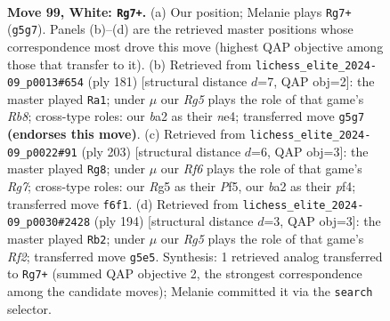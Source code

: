 \documentclass[11pt]{article}
\begin{document}
\clearpage

\begin{figure}[p]\centering
\begin{subfigure}{0.46\textwidth}\centering
\resizebox{\linewidth}{!}{%
\newchessgame
\chessboard[
  setfen={1r6/1k6/5R2/6R1/4K3/8/b7/8 w - - 0 99},
  showmover=false,
  pgfstyle=straightmove, color=movearrow, markmove={g5-g7}
]}
\caption{}
\end{subfigure}\hfill
\begin{subfigure}{0.46\textwidth}\centering
\resizebox{\linewidth}{!}{%
\newchessgame
\chessboard[
  setfen={k7/2RK4/8/8/4N3/8/8/1r6 b - - 56 91},
  showmover=false,
  pgfstyle=straightmove, color=movearrow, markmove={b1-a1}
]}
\caption{}
\end{subfigure}
\\[4pt]
\begin{subfigure}{0.46\textwidth}\centering
\resizebox{\linewidth}{!}{%
\newchessgame
\chessboard[
  setfen={8/4k3/8/5p2/5P2/8/6r1/3RK3 b - - 73 102},
  showmover=false,
  pgfstyle=straightmove, color=movearrow, markmove={g2-g8}
]}
\caption{}
\end{subfigure}\hfill
\begin{subfigure}{0.46\textwidth}\centering
\resizebox{\linewidth}{!}{%
\newchessgame
\chessboard[
  setfen={8/r7/k3b3/8/8/8/5R2/K7 w - - 26 98},
  showmover=false,
  pgfstyle=straightmove, color=movearrow, markmove={f2-b2}
]}
\caption{}
\end{subfigure}
\caption{\textbf{Move 99, White: \texttt{Rg7+}.} (a) Our position; Melanie plays \texttt{Rg7+} (\texttt{g5g7}). Panels (b)--(d) are the retrieved master positions whose correspondence most drove this move (highest QAP objective among those that transfer to it). (b) Retrieved from \texttt{lichess\_elite\_2024-09\_p0013\#654} (ply 181) [structural distance $d$=7, QAP obj=2]: the master played \texttt{Ra1}; under $\mu$ our \emph{Rg5} plays the role of that game's \emph{Rb8}; cross-type roles: our \emph{b}a2 as their \emph{n}e4; transferred move \texttt{g5g7} \textbf{(endorses this move)}. (c) Retrieved from \texttt{lichess\_elite\_2024-09\_p0022\#91} (ply 203) [structural distance $d$=6, QAP obj=3]: the master played \texttt{Rg8}; under $\mu$ our \emph{Rf6} plays the role of that game's \emph{Rg7}; cross-type roles: our \emph{R}g5 as their \emph{P}f5, our \emph{b}a2 as their \emph{p}f4; transferred move \texttt{f6f1}. (d) Retrieved from \texttt{lichess\_elite\_2024-09\_p0030\#2428} (ply 194) [structural distance $d$=3, QAP obj=3]: the master played \texttt{Rb2}; under $\mu$ our \emph{Rg5} plays the role of that game's \emph{Rf2}; transferred move \texttt{g5e5}. Synthesis: 1 retrieved analog transferred to \texttt{Rg7+} (summed QAP objective 2, the strongest correspondence among the candidate moves); Melanie committed it via the \texttt{search} selector.}
\label{fig:thought-m196}
\end{figure}
\end{document}
